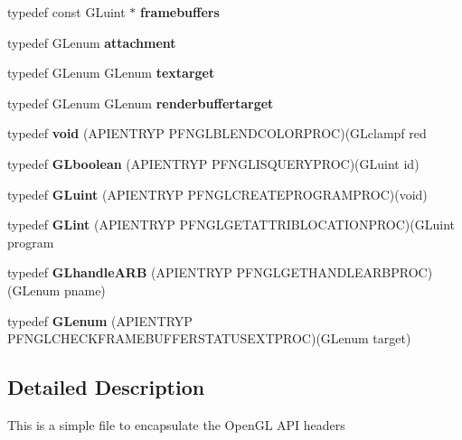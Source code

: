 \begin{DoxyCompactItemize}
\item 
typedef const G\+Luint $\ast$ {\bfseries framebuffers}\label{_s_d_l__opengl_8h_a8e03c10ccdf2060ea88469f578a9cc06}

\item 
typedef G\+Lenum {\bfseries attachment}\label{_s_d_l__opengl_8h_ad8f97111cc6514af5f352219d1cceb40}

\item 
typedef G\+Lenum G\+Lenum {\bfseries textarget}\label{_s_d_l__opengl_8h_aa2b93e62bdaaf32ad646f8df1e87cfdb}

\item 
typedef G\+Lenum G\+Lenum {\bfseries renderbuffertarget}\label{_s_d_l__opengl_8h_ad4ca76f1378b4a8be4243761c8df68e6}

\item 
typedef {\bfseries void} (A\+P\+I\+E\+N\+T\+R\+Y\+P P\+F\+N\+G\+L\+B\+L\+E\+N\+D\+C\+O\+L\+O\+R\+P\+R\+O\+C)(G\+Lclampf red\label{_s_d_l__opengl_8h_a3db05964a3cc4410f35b7ea2b7eb850d}

\item 
typedef {\bfseries G\+Lboolean} (A\+P\+I\+E\+N\+T\+R\+Y\+P P\+F\+N\+G\+L\+I\+S\+Q\+U\+E\+R\+Y\+P\+R\+O\+C)(G\+Luint id)\label{_s_d_l__opengl_8h_a8fe38f5f5d271d25d582135baf95121e}

\item 
typedef {\bfseries G\+Luint} (A\+P\+I\+E\+N\+T\+R\+Y\+P P\+F\+N\+G\+L\+C\+R\+E\+A\+T\+E\+P\+R\+O\+G\+R\+A\+M\+P\+R\+O\+C)(void)\label{_s_d_l__opengl_8h_a2f0c8cd5c21f9fcbd931c3f48bc90dfc}

\item 
typedef {\bfseries G\+Lint} (A\+P\+I\+E\+N\+T\+R\+Y\+P P\+F\+N\+G\+L\+G\+E\+T\+A\+T\+T\+R\+I\+B\+L\+O\+C\+A\+T\+I\+O\+N\+P\+R\+O\+C)(G\+Luint program\label{_s_d_l__opengl_8h_aacf898e4ecb940565baac883dc587ff0}

\item 
typedef {\bfseries G\+Lhandle\+A\+R\+B} (A\+P\+I\+E\+N\+T\+R\+Y\+P P\+F\+N\+G\+L\+G\+E\+T\+H\+A\+N\+D\+L\+E\+A\+R\+B\+P\+R\+O\+C)(G\+Lenum pname)\label{_s_d_l__opengl_8h_aead20ecfc472bd58ebf1f5af54794236}

\item 
typedef {\bfseries G\+Lenum} (A\+P\+I\+E\+N\+T\+R\+Y\+P P\+F\+N\+G\+L\+C\+H\+E\+C\+K\+F\+R\+A\+M\+E\+B\+U\+F\+F\+E\+R\+S\+T\+A\+T\+U\+S\+E\+X\+T\+P\+R\+O\+C)(G\+Lenum target)\label{_s_d_l__opengl_8h_aa4474e19e1c4fc8bbadf5f4fa95736ce}

\end{DoxyCompactItemize}


\subsection{Detailed Description}
This is a simple file to encapsulate the Open\+G\+L A\+P\+I headers 